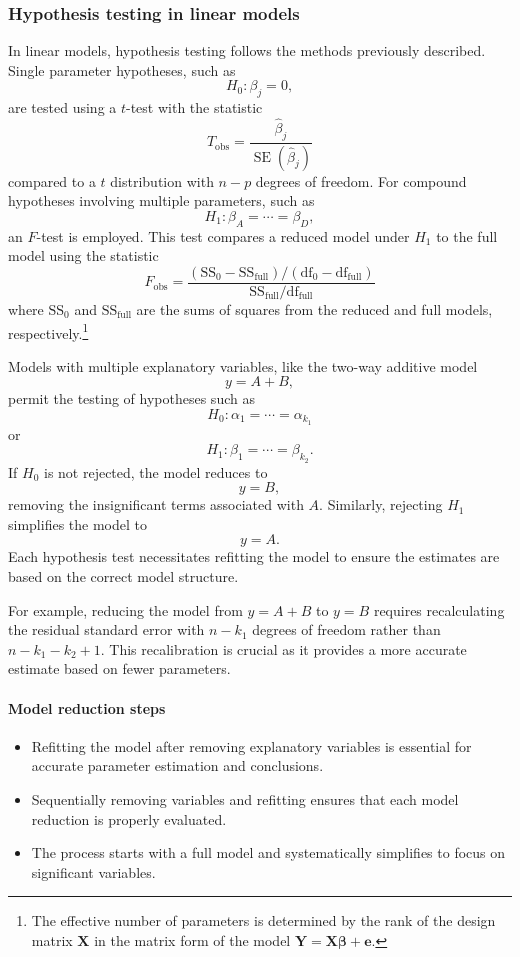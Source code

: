 \documentclass{article}
\begin{document}
\subsubsection{Hypothesis testing in linear models}
In linear models, hypothesis testing follows the methods previously described. Single parameter hypotheses, such as 
\[
H_{0}: \beta_{j}=0,
\]
are tested using a $t$-test with the statistic 
\[
T_{\text{obs}} = \frac{\hat{\beta}_{j}}{\operatorname{SE}(\hat{\beta}_{j})}
\]
compared to a $t$ distribution with $n-p$ degrees of freedom. For compound hypotheses involving multiple parameters, such as 
\[
H_{1}: \beta_{A} = \cdots = \beta_{D},
\]
an $F$-test is employed. This test compares a reduced model under $H_{1}$ to the full model using the statistic
\[
F_{\mathrm{obs}} = \frac{(\mathrm{SS}_{0} - \mathrm{SS}_{\text{full}}) / (\mathrm{df}_{0} - \mathrm{df}_{\mathrm{full}})}{\mathrm{SS}_{\text{full}} / \mathrm{df}_{\text{full}}}
\]
where $\mathrm{SS}_{0}$ and $\mathrm{SS}_{\text{full}}$ are the sums of squares from the reduced and full models, respectively.\footnote{The effective number of parameters is determined by the rank of the design matrix $\boldsymbol{X}$ in the matrix form of the model $\boldsymbol{Y} = \boldsymbol{X} \boldsymbol{\beta} + \boldsymbol{e}$.}

Models with multiple explanatory variables, like the two-way additive model 
\[
y = A + B,
\]
permit the testing of hypotheses such as 
\[
H_{0}: \alpha_{1} = \cdots = \alpha_{k_{1}}
\]
or 
\[
H_{1}: \beta_{1} = \cdots = \beta_{k_{2}}.
\]
If $H_{0}$ is not rejected, the model reduces to 
\[
y = B,
\]
removing the insignificant terms associated with $A$. Similarly, rejecting $H_{1}$ simplifies the model to 
\[
y = A.
\]
Each hypothesis test necessitates refitting the model to ensure the estimates are based on the correct model structure.

For example, reducing the model from $y = A + B$ to $y = B$ requires recalculating the residual standard error with $n - k_{1}$ degrees of freedom rather than $n - k_{1} - k_{2} + 1$. This recalibration is crucial as it provides a more accurate estimate based on fewer parameters.

\paragraph{Model reduction steps}
\begin{itemize}
  \item Refitting the model after removing explanatory variables is essential for accurate parameter estimation and conclusions.
  \item Sequentially removing variables and refitting ensures that each model reduction is properly evaluated.
  \item The process starts with a full model and systematically simplifies to focus on significant variables.
\end{itemize}
\end{document}
